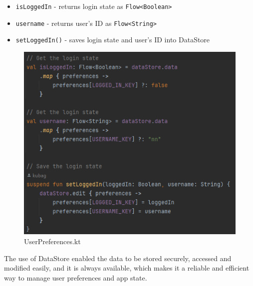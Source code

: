 \begin{itemize}
	\item \texttt{isLoggedIn} - returns login state as \texttt{Flow<Boolean>}
	\item \texttt{username} - returns user's ID as \texttt{Flow<String>}
	\item \texttt{setLoggedIn()} - saves login state and user's ID into DataStore
\end{itemize}

\begin{figure}[H]
	\centering
	\includegraphics[width=0.8\linewidth]{images/UPFunctions.png}
	\caption{UserPreferences.kt}
	\label{fig:user_preferences_functions_view}
\end{figure}

The use of DataStore enabled the data to be stored securely, accessed and modified easily, and it is always available, which makes it a reliable and efficient way to manage user preferences and app state.

